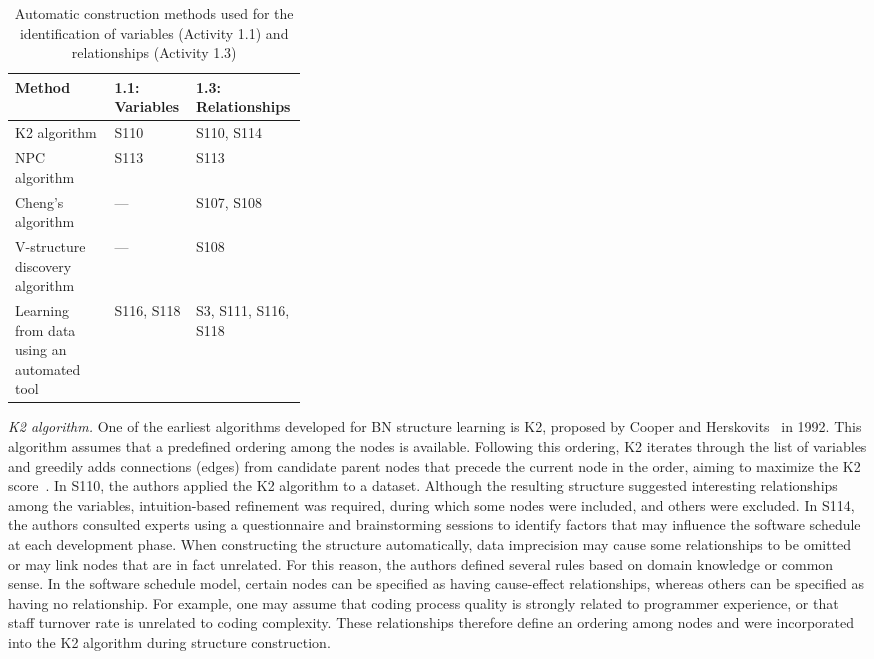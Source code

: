 \begin{table}[t]
\caption{Automatic construction methods used for the identification of variables (Activity 1.1) and relationships (Activity 1.3)}
\label{tab:metodos_construcao_automatica}
\centering
\small
\setlength{\tabcolsep}{6pt}
\renewcommand{\arraystretch}{1.2}

\begin{tabularx}{\linewidth}{>{\raggedright\arraybackslash}p{0.34\linewidth}
                              >{\raggedright\arraybackslash}X
                              >{\raggedright\arraybackslash}X}
\toprule
\textbf{Method} & \textbf{1.1: Variables} & \textbf{1.3: Relationships} \\
\midrule
K2 algorithm
& S110
& S110, S114 \\
NPC algorithm
& S113
& S113 \\
Cheng's algorithm
& ---
& S107, S108 \\
V-structure discovery algorithm
& ---
& S108 \\
Learning from data using an automated tool
& S116, S118
& S3, S111, S116, S118 \\
\bottomrule
\end{tabularx}
\end{table}

\textit{K2 algorithm.} One of the earliest algorithms developed for BN structure learning is K2, proposed by Cooper and Herskovits~\cite{cooper1992bayesian} in 1992. This algorithm assumes that a predefined ordering among the nodes is available. Following this ordering, K2 iterates through the list of variables and greedily adds connections (edges) from candidate parent nodes that precede the current node in the order, aiming to maximize the K2 score~\cite{kitson2023survey}. In S110, the authors applied the K2 algorithm to a dataset. Although the resulting structure suggested interesting relationships among the variables, intuition-based refinement was required, during which some nodes were included, and others were excluded. In S114, the authors consulted experts using a questionnaire and brainstorming sessions to identify factors that may influence the software schedule at each development phase. When constructing the structure automatically, data imprecision may cause some relationships to be omitted or may link nodes that are in fact unrelated. For this reason, the authors defined several rules based on domain knowledge or common sense. In the software schedule model, certain nodes can be specified as having cause-effect relationships, whereas others can be specified as having no relationship. For example, one may assume that coding process quality is strongly related to programmer experience, or that staff turnover rate is unrelated to coding complexity. These relationships therefore define an ordering among nodes and were incorporated into the K2 algorithm during structure construction.

